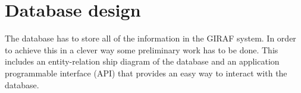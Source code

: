 \section{Database design}
The database has to store all of the information in the GIRAF system. In order to achieve this in a clever way some preliminary work has to be done. This includes an entity-relation ship diagram of the database and an application programmable interface (API) that provides an easy way to interact with the database. 
